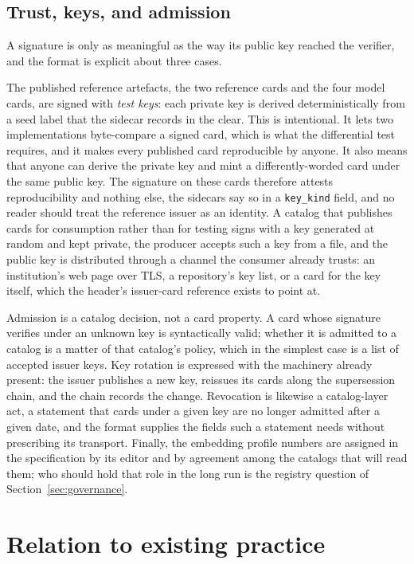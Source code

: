 \documentclass[sigconf]{acmart}
\begin{document}
\subsection{Trust, keys, and admission}
\label{sec:trust}

A signature is only as meaningful as the way its public key reached the
verifier, and the format is explicit about three cases.

The published reference artefacts, the two reference cards and the four
model cards, are signed with \emph{test keys}: each private key is derived
deterministically from a seed label that the sidecar records in the clear.
This is intentional. It lets two implementations byte-compare a signed card,
which is what the differential test requires, and it makes every published
card reproducible by anyone. It also means that anyone can derive the private
key and mint a differently-worded card under the same public key. The
signature on these cards therefore attests reproducibility and nothing else,
the sidecars say so in a \texttt{key\_kind} field, and no reader should treat
the reference issuer as an identity. A catalog that publishes cards for
consumption rather than for testing signs with a key generated at random and
kept private, the producer accepts such a key from a file, and the public key
is distributed through a channel the consumer already trusts: an
institution's web page over TLS, a repository's key list, or a card for the
key itself, which the header's issuer-card reference exists to point at.

Admission is a catalog decision, not a card property. A card whose signature
verifies under an unknown key is syntactically valid; whether it is admitted
to a catalog is a matter of that catalog's policy, which in the simplest case
is a list of accepted issuer keys. Key rotation is expressed with the
machinery already present: the issuer publishes a new key, reissues its cards
along the supersession chain, and the chain records the change. Revocation
is likewise a catalog-layer act, a statement that cards under a given key are
no longer admitted after a given date, and the format supplies the fields
such a statement needs without prescribing its transport. Finally, the
embedding profile numbers are assigned in the specification by its editor and
by agreement among the catalogs that will read them; who should hold that
role in the long run is the registry question of Section~\ref{sec:governance}.

\section{Relation to existing practice}
\label{sec:related}
\end{document}
